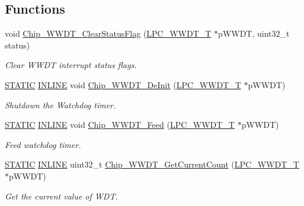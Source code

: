 \subsection*{Functions}
\begin{DoxyCompactItemize}
\item 
void \hyperlink{group__WWDT__17XX__40XX_ga6e6453450170638f554e7ba3c548ec4a}{Chip\+\_\+\+W\+W\+D\+T\+\_\+\+Clear\+Status\+Flag} (\hyperlink{structLPC__WWDT__T}{L\+P\+C\+\_\+\+W\+W\+D\+T\+\_\+T} $\ast$p\+W\+W\+DT, uint32\+\_\+t status)
\begin{DoxyCompactList}\small\item\em Clear W\+W\+DT interrupt status flags. \end{DoxyCompactList}\item 
\hyperlink{group__LPC__Types__Public__Macros_ga10b2d890d871e1489bb02b7e70d9bdfb}{S\+T\+A\+T\+IC} \hyperlink{group__LPC__Types__Public__Types_ga2eb6f9e0395b47b8d5e3eeae4fe0c116}{I\+N\+L\+I\+NE} void \hyperlink{group__WWDT__17XX__40XX_gaac3365ace1492b5ccc89472fb3f2cfc0}{Chip\+\_\+\+W\+W\+D\+T\+\_\+\+De\+Init} (\hyperlink{structLPC__WWDT__T}{L\+P\+C\+\_\+\+W\+W\+D\+T\+\_\+T} $\ast$p\+W\+W\+DT)
\begin{DoxyCompactList}\small\item\em Shutdown the Watchdog timer. \end{DoxyCompactList}\item 
\hyperlink{group__LPC__Types__Public__Macros_ga10b2d890d871e1489bb02b7e70d9bdfb}{S\+T\+A\+T\+IC} \hyperlink{group__LPC__Types__Public__Types_ga2eb6f9e0395b47b8d5e3eeae4fe0c116}{I\+N\+L\+I\+NE} void \hyperlink{group__WWDT__17XX__40XX_ga88db6aef307efd5cbc629695c4678006}{Chip\+\_\+\+W\+W\+D\+T\+\_\+\+Feed} (\hyperlink{structLPC__WWDT__T}{L\+P\+C\+\_\+\+W\+W\+D\+T\+\_\+T} $\ast$p\+W\+W\+DT)
\begin{DoxyCompactList}\small\item\em Feed watchdog timer. \end{DoxyCompactList}\item 
\hyperlink{group__LPC__Types__Public__Macros_ga10b2d890d871e1489bb02b7e70d9bdfb}{S\+T\+A\+T\+IC} \hyperlink{group__LPC__Types__Public__Types_ga2eb6f9e0395b47b8d5e3eeae4fe0c116}{I\+N\+L\+I\+NE} uint32\+\_\+t \hyperlink{group__WWDT__17XX__40XX_ga4b1c8d2f48a8397d63c1c3c74dc7e82a}{Chip\+\_\+\+W\+W\+D\+T\+\_\+\+Get\+Current\+Count} (\hyperlink{structLPC__WWDT__T}{L\+P\+C\+\_\+\+W\+W\+D\+T\+\_\+T} $\ast$p\+W\+W\+DT)
\begin{DoxyCompactList}\small\item\em Get the current value of W\+DT. \end{DoxyCompactList}\item 

\end{DoxyCompactItemize}
